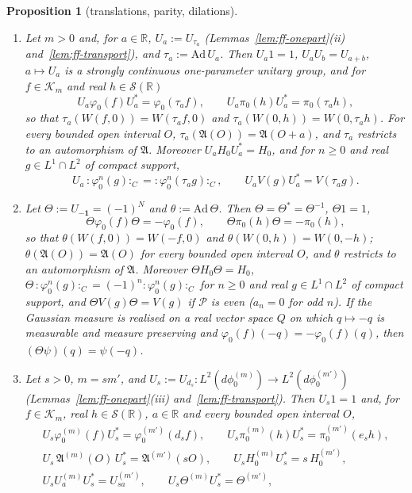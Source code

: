 \documentclass[11pt,a4paper]{article}
\theoremstyle{plain}
\newtheorem{proposition}[theorem]{Proposition}
\theoremstyle{definition}
\theoremstyle{plain}
\theoremstyle{definition}
\newcommand{\R}{\mathbb{R}}
\newcommand{\A}{\mathfrak{A}}
\begin{document}
\begin{proposition}[translations, parity, dilations]\label{prop:ff-symmetries}
\leavevmode
\begin{enumerate}
\item[\textup{(T)}] Let $m>0$ and, for $a\in\R$, $U_a:=U_{\tau_a}$
(Lemmas~\ref{lem:ff-onepart}(ii) and~\ref{lem:ff-transport}), and $\tau_a:=\mathrm{Ad}\,U_a$.
Then $U_a1=1$, $U_aU_b=U_{a+b}$, $a\mapsto U_a$ is a strongly continuous one-parameter unitary
group, and for $f\in\mathcal K_m$ and real $h\in\mathcal S(\R)$
\[
 U_a\varphi_0(f)U_a^*=\varphi_0(\tau_af),\qquad U_a\pi_0(h)U_a^*=\pi_0(\tau_ah),
\]
so that $\tau_a(W(f,0))=W(\tau_af,0)$ and $\tau_a(W(0,h))=W(0,\tau_ah)$.  For every bounded open
interval $O$, $\tau_a(\A(O))=\A(O+a)$, and $\tau_a$ restricts to an automorphism of $\A$.
Moreover $U_aH_0U_a^*=H_0$, and for $n\ge0$ and real $g\in L^1\cap L^2$ of compact support,
\[
 U_a\,{:}\varphi_0^n(g){:}_C={:}\varphi_0^n(\tau_ag){:}_C,\qquad U_aV(g)U_a^*=V(\tau_ag) .
\]
\item[\textup{(P)}] Let $\Theta:=U_{-\mathbf 1}=(-1)^N$ and $\theta:=\mathrm{Ad}\,\Theta$.  Then
$\Theta=\Theta^*=\Theta^{-1}$, $\Theta1=1$,
\[
 \Theta\varphi_0(f)\Theta=-\varphi_0(f),\qquad\Theta\pi_0(h)\Theta=-\pi_0(h),
\]
so that $\theta(W(f,0))=W(-f,0)$ and $\theta(W(0,h))=W(0,-h)$; $\theta(\A(O))=\A(O)$ for every
bounded open interval $O$, and $\theta$ restricts to an automorphism of $\A$.  Moreover
$\Theta H_0\Theta=H_0$, $\Theta\,{:}\varphi_0^n(g){:}_C=(-1)^n{:}\varphi_0^n(g){:}_C$ for $n\ge0$
and real $g\in L^1\cap L^2$ of compact support, and $\Theta V(g)\Theta=V(g)$ if $\mathscr P$ is
even ($a_n=0$ for odd $n$).  If the Gaussian
measure is realised on a real vector space $Q$ on which $q\mapsto-q$ is measurable and measure
preserving and $\varphi_0(f)(-q)=-\varphi_0(f)(q)$, then $(\Theta\psi)(q)=\psi(-q)$.
\item[\textup{(D)}] Let $s>0$, $m=sm'$, and $U_s:=U_{d_s}:L^2(d\phi_0^{(m)})\to
L^2(d\phi_0^{(m')})$ (Lemmas~\ref{lem:ff-onepart}(iii) and~\ref{lem:ff-transport}).  Then
$U_s1=1$ and, for $f\in\mathcal K_m$, real $h\in\mathcal S(\R)$, $a\in\R$ and every bounded open
interval $O$,
\begin{gather*}
 U_s\varphi_0^{(m)}(f)U_s^*=\varphi_0^{(m')}(d_sf),\qquad
 U_s\pi_0^{(m)}(h)U_s^*=\pi_0^{(m')}(e_sh),\\
 U_s\,\A^{(m)}(O)\,U_s^*=\A^{(m')}(sO),\qquad U_sH_0^{(m)}U_s^*=s\,H_0^{(m')},\\
 U_sU_a^{(m)}U_s^*=U_{sa}^{(m')},\qquad U_s\Theta^{(m)}U_s^*=\Theta^{(m')} ,
\end{gather*}

\end{enumerate}
\end{proposition}
\end{document}
